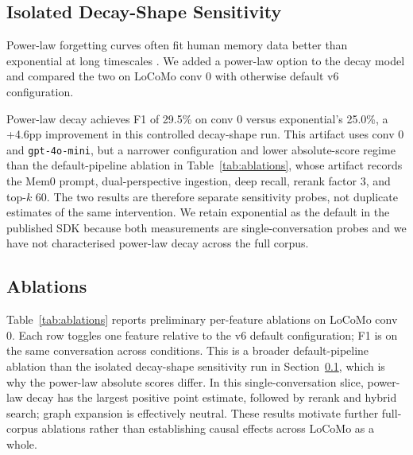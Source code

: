 \documentclass[11pt,a4paper]{article}
\begin{document}
\subsection{Isolated Decay-Shape Sensitivity}
\label{sec:eval-decay}

Power-law forgetting curves often fit human memory data better than exponential at long timescales \citep{murre2015replication, wixted2004psychology}. We added a power-law option to the decay model and compared the two on LoCoMo conv 0 with otherwise default v6 configuration.

Power-law decay achieves F1 of 29.5\% on conv 0 versus exponential's 25.0\%, a +4.6pp improvement in this controlled decay-shape run. This artifact uses conv 0 and \texttt{gpt-4o-mini}, but a narrower configuration and lower absolute-score regime than the default-pipeline ablation in Table~\ref{tab:ablations}, whose artifact records the Mem0 prompt, dual-perspective ingestion, deep recall, rerank factor 3, and top-$k$ 60. The two results are therefore separate sensitivity probes, not duplicate estimates of the same intervention. We retain exponential as the default in the published SDK because both measurements are single-conversation probes and we have not characterised power-law decay across the full corpus.

\subsection{Ablations}
\label{sec:eval-ablations}

Table~\ref{tab:ablations} reports preliminary per-feature ablations on LoCoMo conv 0. Each row toggles one feature relative to the v6 default configuration; F1 is on the same conversation across conditions. This is a broader default-pipeline ablation than the isolated decay-shape sensitivity run in Section~\ref{sec:eval-decay}, which is why the power-law absolute scores differ. In this single-conversation slice, power-law decay has the largest positive point estimate, followed by rerank and hybrid search; graph expansion is effectively neutral. These results motivate further full-corpus ablations rather than establishing causal effects across LoCoMo as a whole.
\end{document}
